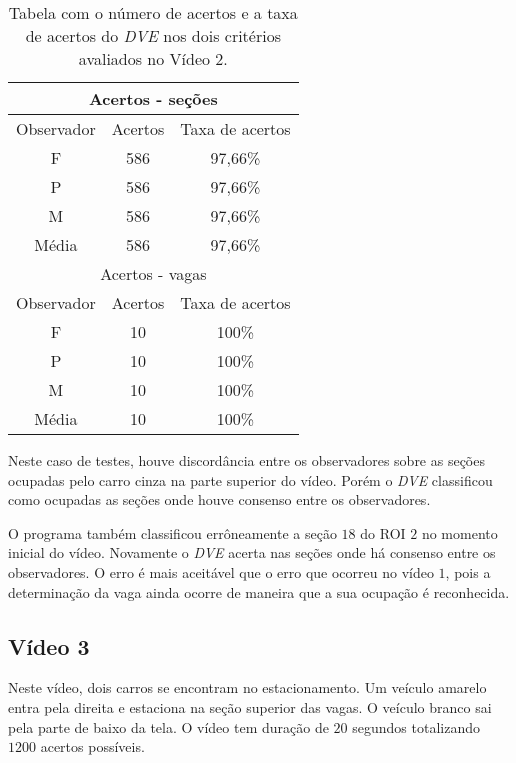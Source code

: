 \begin{table}[H]
\begin{center}
\begin{tabular}{|c||c||c|}
\hline
\multicolumn{3}{|c|}{Acertos - seções}  \\ \hline \hline
Observador & Acertos & Taxa de acertos \\ \hline
F & 586 & 97,66\% \\  \hline
P & 586 & 97,66\% \\ \hline
M & 586 & 97,66\% \\ \hline
Média & 586 & 97,66\% \\
\hline
\hline
\multicolumn{3}{|c|}{Acertos - vagas}  \\ \hline \hline
Observador & Acertos & Taxa de acertos \\ \hline
F & 10 & 100\% \\  \hline
P & 10 & 100\% \\ \hline
M & 10 & 100\% \\ \hline
Média & 10 & 100\% \\
\hline
\end{tabular}

\end{center}
\caption{Tabela com o número de acertos e a taxa de acertos do \textit{DVE} nos dois critérios avaliados no Vídeo 2.}
\label{tab:rvideo2}
\end{table}




Neste caso de testes, houve discordância entre os observadores sobre as seções ocupadas pelo carro cinza na parte superior do vídeo. Porém o \textit{DVE} classificou como ocupadas as seções onde houve consenso entre os observadores.

O programa também classificou errôneamente a seção $18$ do ROI $2$ no momento inicial do vídeo. Novamente o \textit{DVE} acerta nas seções onde há consenso entre os observadores. O erro é mais aceitável que o erro que ocorreu no vídeo $1$, pois a determinação da vaga ainda ocorre de maneira que a sua ocupação é reconhecida.

\subsection{Vídeo 3}

Neste vídeo, dois carros se encontram no estacionamento. Um veículo amarelo entra pela direita e estaciona na seção superior das vagas. O veículo branco sai pela parte de baixo da tela. O vídeo tem duração de $20$ segundos totalizando $1200$ acertos possíveis.

